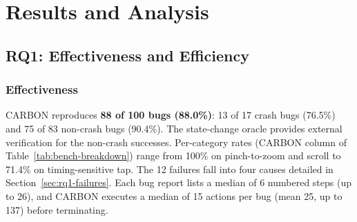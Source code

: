 \documentclass[10pt,conference,a4paper]{IEEEtran}
\begin{document}
  \section{Results and Analysis}
  \label{sec:results}

  \subsection{RQ1: Effectiveness and Efficiency}
  \label{sec:rq1}

  \subsubsection{Effectiveness}
  CARBON reproduces \textbf{88 of 100 bugs (88.0\%)}: 13 of 17 crash
  bugs (76.5\%) and 75 of 83 non-crash bugs (90.4\%). The state-change
  oracle provides external verification for the non-crash successes. Per-category rates
  (CARBON column of Table~\ref{tab:bench-breakdown}) range from 100\% on
  pinch-to-zoom and scroll to 71.4\% on timing-sensitive tap. The 12 failures fall
  into four causes detailed in Section~\ref{sec:rq1-failures}. Each bug report lists a median of 6
  numbered steps (up to 26), and CARBON executes a median of 15 actions
  per bug (mean 25, up to 137) before terminating.
\end{document}
